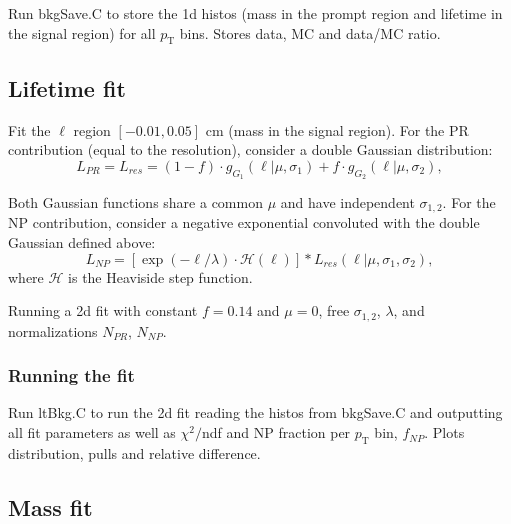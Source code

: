 \documentclass{article}
\newcommand{\pt}{p_\text{T}}
\begin{document}
Run bkgSave.C to store the 1d histos (mass in the prompt region and lifetime in the signal region) for all $\pt$ bins. Stores data, MC and data/MC ratio.


\subsection{Lifetime fit}

Fit the $\ell$ region $[-0.01,0.05]$ cm (mass in the signal region). For the PR contribution (equal to the resolution), consider a double Gaussian distribution:
\begin{equation}
L_{PR}=L_{res} = (1-f)\cdot g_{G_1}(\ell|\mu, \sigma_1)+f\cdot g_{G_2}(\ell|\mu, \sigma_2),
\end{equation}

Both Gaussian functions share a common $\mu$ and have independent $\sigma_{1,2}$. For the NP contribution, consider a negative exponential convoluted with the double Gaussian defined above:
\begin{equation}
L_{NP}=	\left[\exp(-\ell/\lambda)\cdot\mathcal{H}(\ell)\right]*L_{res}(\ell|\mu, \sigma_1,\sigma_2),
\end{equation}
where $\mathcal{H}$ is the Heaviside step function.

Running a 2d fit with constant $f=0.14$ and $\mu=0$, free $\sigma_{1,2}$, $\lambda$, and normalizations $N_{PR}$, $N_{NP}$.

\subsubsection{Running the fit}

Run ltBkg.C to run the 2d fit reading the histos from bkgSave.C and outputting all fit parameters as well as $\chi^2/$ndf and NP fraction per $\pt$ bin, $f_{NP}$. Plots distribution, pulls and relative difference.

\subsection{Mass fit}
\end{document}
